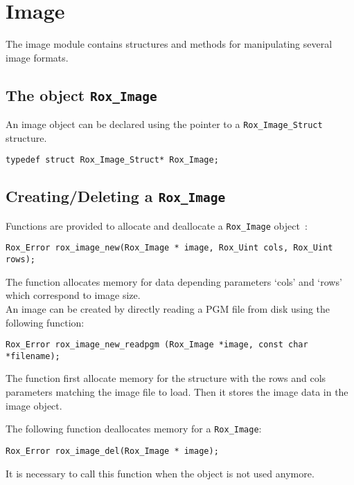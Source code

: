 \section{Image}
\label{sec:image}

The image module contains structures and methods for manipulating several image formats. 

\subsection{The object {\tt Rox\_Image}}
\label{sse:image_object}

An image object can be declared using the pointer to a \lstinline$Rox_Image_Struct$ structure. 
\begin{lstlisting}
typedef struct Rox_Image_Struct* Rox_Image;
\end{lstlisting}

\subsection{Creating/Deleting a {\tt Rox\_Image}}
\label{sse:image_newdel}

Functions are provided to allocate and deallocate a \lstinline$Rox_Image$ object~:

\begin{lstlisting}
Rox_Error rox_image_new(Rox_Image * image, Rox_Uint cols, Rox_Uint rows);
\end{lstlisting}

The function allocates memory for data depending parameters  `cols' and `rows' which correspond to image size.\\

An image can be created by directly reading a PGM file from disk using the following function:
\begin{lstlisting}
Rox_Error rox_image_new_readpgm (Rox_Image *image, const char *filename);
\end{lstlisting}
The function first allocate memory for the structure with the rows and
cols parameters matching the image file to load. Then it stores the
image data in the image object.

The following function deallocates memory for a \lstinline$Rox_Image$:
\begin{lstlisting}
Rox_Error rox_image_del(Rox_Image * image);
\end{lstlisting}
 It is necessary to call this function when the object is not used anymore.


